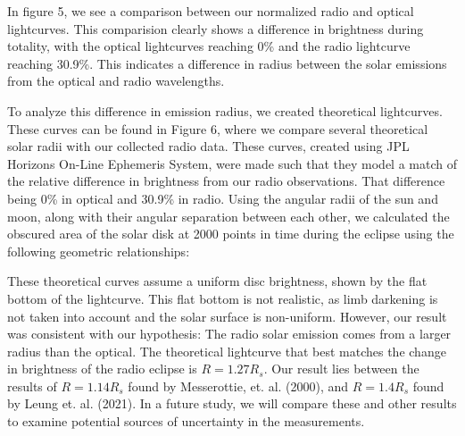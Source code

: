 In figure 5, we see a comparison between our normalized radio and optical lightcurves.
This comparision clearly shows a difference in brightness during totality, with the optical lightcurves reaching 0\% and the radio lightcurve reaching 30.9\%.
This indicates a difference in radius between the solar emissions from the optical and radio wavelengths.

To analyze this difference in emission radius, we created theoretical lightcurves.
These  curves can be found in Figure 6, where we compare several theoretical solar radii with our collected radio data.
These curves, created using JPL Horizons On-Line Ephemeris System, were made such that they model a match of the relative difference in brightness from our radio observations.
That difference being 0\% in optical and 30.9\% in radio.
Using the angular radii of the sun and moon, along with their angular separation between each other, we calculated the obscured area of the solar disk at 2000 points in time during the eclipse using the following geometric relationships:

These theoretical curves assume a uniform disc brightness, shown by the flat bottom of the lightcurve.
This flat bottom is not realistic, as limb darkening is not taken into account and the solar surface is non-uniform.
However, our result was consistent with our hypothesis: The radio solar emission comes from a larger radius than the optical.
The theoretical lightcurve that best matches the change in brightness of the radio eclipse is $R = 1.27R_s$.
Our result lies between the results of $R=1.14R_s$ found by Messerottie, et. al. (2000), and $R=1.4R_s$ found by Leung et. al. (2021).
In a future study, we will compare these and other results to examine potential sources of uncertainty in the measurements.
